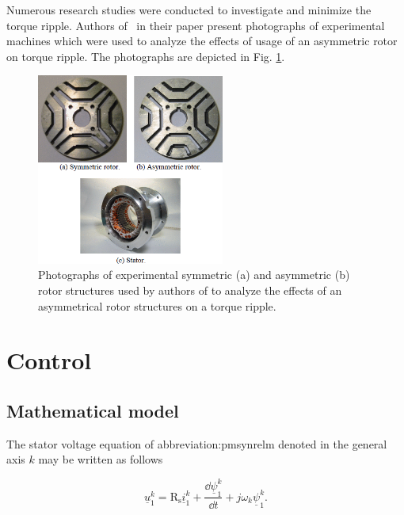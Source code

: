 \documentclass[a4paper, twoside, 11pt]{article}
\begin{document}
    \par
    Numerous research studies were conducted to investigate and minimize the torque ripple. Authors of~\cite{sanada-Torque-ripple-improvement-for-synchronous-reluctance-motor-using-asymmetric-flux-barrier-arrangement} in their paper present photographs of experimental machines which were used to analyze the effects of usage of an asymmetric rotor on torque ripple. The photographs are depicted in Fig. \ref{fig:asymmetrical-rotor-experimental-photos}.

        \begin{figure}[htbp!]
            \centering
            \includegraphics[width=0.55\textwidth]{src/png/asymmetrical-rotor-experimental-photos.png}
            \caption{Photographs of experimental symmetric (a) and asymmetric (b) rotor structures used by authors of \cite{sanada-Torque-ripple-improvement-for-synchronous-reluctance-motor-using-asymmetric-flux-barrier-arrangement} to analyze the effects of an asymmetrical rotor structures on a torque ripple.}
            \label{fig:asymmetrical-rotor-experimental-photos}
        \end{figure}

\FloatBarrier
\section{Control}

    \subsection{Mathematical model}
        The stator voltage equation of \gls{abbreviation:pmsynrelm} denoted in the general axis $k$ may be written as follows

        \begin{equation}\label{eq:voltage-equation}
            \underline{u}^k_1 = \text{R}_\text{s} \underline{i}^k_1 + \frac{\dd \underline{\psi}^k_1 }{\dd t} + j \omega_k \underline{\psi}^k_1.
        \end{equation}
\end{document}
